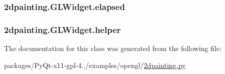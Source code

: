 \subsubsection[{elapsed}]{\setlength{\rightskip}{0pt plus 5cm}2dpainting.\+G\+L\+Widget.\+elapsed}\label{class2dpainting_1_1GLWidget_ac4ad9978c23cd33694f3c39effc44a13}
\hypertarget{class2dpainting_1_1GLWidget_a0795146d5f73b5c3d0c6199bd8675bc5}{}
\subsubsection[{helper}]{\setlength{\rightskip}{0pt plus 5cm}2dpainting.\+G\+L\+Widget.\+helper}\label{class2dpainting_1_1GLWidget_a0795146d5f73b5c3d0c6199bd8675bc5}


The documentation for this class was generated from the following file\+:\begin{DoxyCompactItemize}
\item 
packages/\+Py\+Qt-\/x11-\/gpl-\/4../examples/opengl/\hyperlink{2dpainting_8py}{2dpainting.\+py}\end{DoxyCompactItemize}
